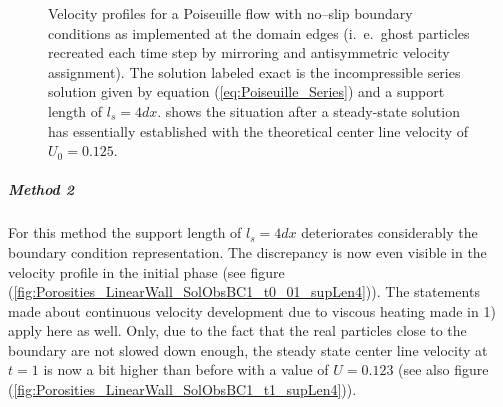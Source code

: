 \documentclass{report}
\begin{document}
\begin{figure}[!htbp]
\caption[Velocity profiles Poiseuille flow]{Velocity profiles for a Poiseuille flow with no--slip boundary conditions as implemented at the domain edges (i.\ e.\ ghost particles recreated each time step by mirroring and antisymmetric velocity assignment). The solution labeled exact is the incompressible series solution given by equation (\ref{eq:Poiseuille_Series}) and a support length of $l_s=4dx$.   shows the situation after a steady-state solution has essentially established with the theoretical center line velocity of $U_0=0.125$.}

\end{figure} 

\subparagraph{Method 2}
For this method the support length of $l_s=4dx$ deteriorates considerably the boundary condition representation. The discrepancy is now even visible in the velocity profile in the initial phase (see figure (\ref{fig:Porosities_LinearWall_SolObsBC1_t0_01_supLen4})).
The statements made about continuous velocity development due to viscous heating made in 1) apply here as well. Only, due to the fact that the real particles close to the boundary are not slowed down enough, the steady state center line velocity at $t=1$ is now a bit higher than before with a value of $U=0.123$ (see also figure (\ref{fig:Porosities_LinearWall_SolObsBC1_t1_supLen4})). 
 
\end{document}
